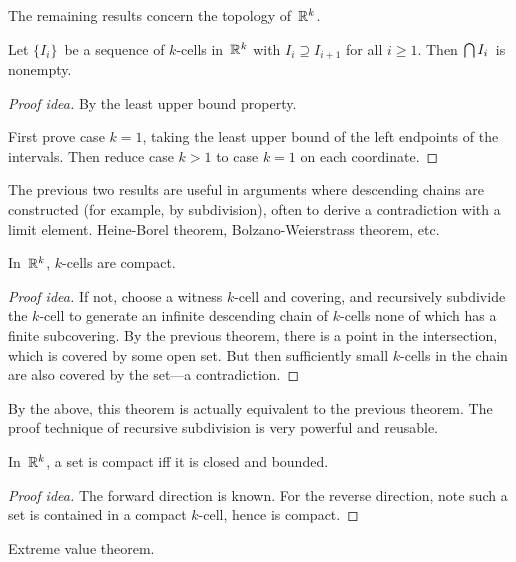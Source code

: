 \noindent The remaining results concern the topology of~\(\mathbb{R}^k\).

\begin{thm}
Let \(\{I_i\}\)~be a sequence of \(k\)-cells in~\(\mathbb{R}^k\) with \(I_i\supseteq I_{i+1}\) for all \(i\ge 1\). Then \(\bigcap I_i\)~is nonempty.
\end{thm}
\begin{proof}[Proof idea]
By the least upper bound property.

First prove case \(k=1\), taking the least upper bound of the left endpoints of the intervals. Then reduce case \(k>1\) to case \(k=1\) on each coordinate.
\end{proof}
\begin{app}
The previous two results are useful in arguments where descending chains are constructed (for example, by subdivision), often to derive a contradiction with a limit element. Heine-Borel theorem, Bolzano-Weierstrass theorem, etc.
\end{app}

\begin{thm}
In~\(\mathbb{R}^k\), \(k\)-cells are compact.
\end{thm}
\begin{proof}[Proof idea]
If not, choose a witness \(k\)-cell and covering, and recursively subdivide the \(k\)-cell to generate an infinite descending chain of \(k\)-cells none of which has a finite subcovering. By the previous theorem, there is a point in the intersection, which is covered by some open set. But then sufficiently small \(k\)-cells in the chain are also covered by the set---a contradiction.
\end{proof}

\begin{rmk}
By the above, this theorem is actually equivalent to the previous theorem. The proof technique of recursive subdivision is very powerful and reusable.
\end{rmk}

\begin{cor}
In~\(\mathbb{R}^k\), a set is compact iff it is closed and bounded.
\end{cor}
\begin{proof}[Proof idea]
The forward direction is known. For the reverse direction, note such a set is contained in a compact \(k\)-cell, hence is compact.
\end{proof}
\begin{app}
Extreme value theorem.
\end{app}

